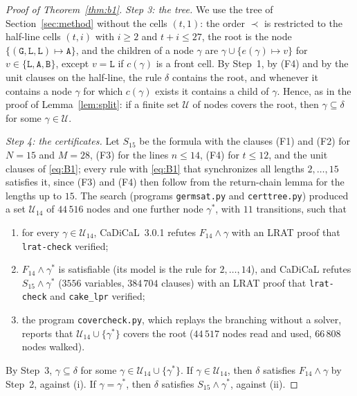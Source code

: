 \documentclass[11pt]{article}
\theoremstyle{remark}
\newcommand{\Lq}{\mathtt{L}}\newcommand{\Gq}{\mathtt{G}}\newcommand{\Aq}{\mathtt{A}}\newcommand{\Bq}{\mathtt{B}}\newcommand{\Fq}{\mathtt{F}}
\begin{document}
\begin{proof}[Proof of Theorem~\ref{thm:b1}]
\emph{Step 3: the tree.} We use the tree of Section~\ref{sec:method} without the cells $(t,1)$: the order
$\prec$ is restricted to the half-line cells $(t,i)$ with $i\ge2$ and $t+i\le27$, the root is the node
$\{(\Gq,\Lq,\Lq)\mapsto\Aq\}$, and the children of a node $\gamma$ are $\gamma\cup\{e(\gamma)\mapsto v\}$ for
$v\in\{\Lq,\Aq,\Bq\}$, except $v=\Lq$ if $c(\gamma)$ is a front cell. By Step~1, by (F4) and by the unit
clauses on the half-line, the rule $\delta$ contains the root, and whenever it contains a node $\gamma$ for
which $c(\gamma)$ exists it contains a child of $\gamma$. Hence, as in the proof of
Lemma~\ref{lem:split}: if a finite set $\mathcal U$ of nodes covers the root, then $\gamma\subseteq\delta$ for
some $\gamma\in\mathcal U$.

\emph{Step 4: the certificates.} Let $S_{15}$ be the formula with the clauses (F1) and (F2) for $N=15$ and
$M=28$, (F3) for the lines $n\le14$, (F4) for $t\le12$, and the unit clauses of \eqref{eq:B1}; every rule with
\eqref{eq:B1} that synchronizes all lengths $2,\dots,15$ satisfies it, since (F3) and (F4) then follow from
the return-chain lemma for the lengths up to $15$. The search (programs \texttt{germsat.py} and
\texttt{certtree.py}) produced a set $\mathcal U_{14}$ of $44\,516$ nodes and one further node $\gamma^\ast$,
with $11$ transitions, such that
\begin{enumerate}[label=\textup{(\roman*)},nosep]
\item for every $\gamma\in\mathcal U_{14}$, CaDiCaL~3.0.1 refutes $F_{14}\wedge\gamma$ with an LRAT proof that
\texttt{lrat-check} verified;
\item $F_{14}\wedge\gamma^\ast$ is satisfiable (its model is the rule for $2,\dots,14$), and CaDiCaL refutes
$S_{15}\wedge\gamma^\ast$ ($3556$ variables, $384\,704$ clauses) with an LRAT proof that \texttt{lrat-check}
and \texttt{cake\_lpr} verified;
\item the program \texttt{covercheck.py}, which replays the branching without a solver, reports that
$\mathcal U_{14}\cup\{\gamma^\ast\}$ covers the root ($44\,517$ nodes read and used, $66\,808$ nodes walked).
\end{enumerate}
By Step~3, $\gamma\subseteq\delta$ for some $\gamma\in\mathcal U_{14}\cup\{\gamma^\ast\}$. If
$\gamma\in\mathcal U_{14}$, then $\delta$ satisfies $F_{14}\wedge\gamma$ by Step~2, against (i). If
$\gamma=\gamma^\ast$, then $\delta$ satisfies $S_{15}\wedge\gamma^\ast$, against (ii).
\end{proof}
\end{document}
